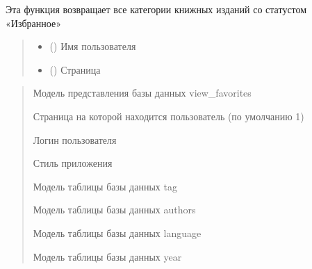 \documentclass[letterpaper,10pt,russian]{sphinxmanual}
\begin{document}
\begin{fulllineitems}
\label{\detokenize{blueprints:blueprints.select_books_state.favorites}}
\pysigstartsignatures
{}
\pysigstopsignatures
\sphinxAtStartPar
Эта функция возвращает все категории книжных изданий со статустом «Избранное»
\begin{quote}\begin{description}
\begin{itemize}
\item {} 
\sphinxAtStartPar
{} () \textendash{} Имя пользователя

\item {} 
\sphinxAtStartPar
{} () \textendash{} Страница

\end{itemize}

\end{description}\end{quote}
\begin{description}
\begin{quote}\begin{description}
\sphinxAtStartPar
Модель представления базы данных view\_favorites

\sphinxAtStartPar
Страница на которой находится пользователь (по умолчанию 1)

\sphinxAtStartPar
Логин пользователя

\sphinxAtStartPar
Стиль приложения

\sphinxAtStartPar
Модель таблицы базы данных tag

\sphinxAtStartPar
Модель таблицы базы данных authors

\sphinxAtStartPar
Модель таблицы базы данных language

\sphinxAtStartPar
Модель таблицы базы данных year


\end{description}
\end{quote}
\end{description}
\end{fulllineitems}
\end{document}
